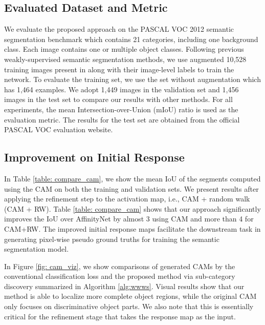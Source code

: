 \documentclass[10pt,twocolumn,letterpaper]{article}
\begin{document}
\subsection{Evaluated Dataset and Metric}
We evaluate the proposed approach on the PASCAL VOC 2012 semantic segmentation benchmark \cite{PASCAL_VOC_2010_Data} which contains 21 categories, including one background class. 
Each image contains one or multiple object classes. Following previous weakly-supervised semantic segmentation methods, we use augmented 10,528 training images present in \cite{hariharan2011semantic} along with their image-level labels to train the network. 
To evaluate the training set, we use the set without augmentation which has 1,464 examples. 
We adopt 1,449 images in the validation set and 1,456 images in the test set to compare our results with other methods. 
For all experiments, the mean Intersection-over-Union (mIoU) ratio is used as the evaluation metric. 
The results for the test set are obtained from the official PASCAL VOC evaluation website.








\subsection{Improvement on Initial Response}
In Table \ref{table: compare_cam}, we show the mean IoU of the segments computed using the CAM on both the training and validation sets.
We present results after applying the refinement step to the activation map, i.e., CAM + random walk (CAM + RW).
Table \ref{table: compare_cam} shows that our approach significantly improves the IoU over AffinityNet \cite{ahn2018learning} by almost 3 using CAM and more than 4 for CAM+RW.
The improved initial response maps facilitate the downstream task in generating pixel-wise pseudo ground truths for training the semantic segmentation model.


In Figure \ref{fig: cam_viz}, we show comparisons of generated CAMs by the conventional classification loss  \cite{zhou2016learning} and the proposed method via sub-category discovery summarized in Algorithm \ref{alg:wwws}.
Visual results show that our method is able to localize more complete object regions, while the original CAM only focuses on discriminative object parts.
We also note that this is essentially critical for the refinement stage that takes the response map as the input.
\end{document}
